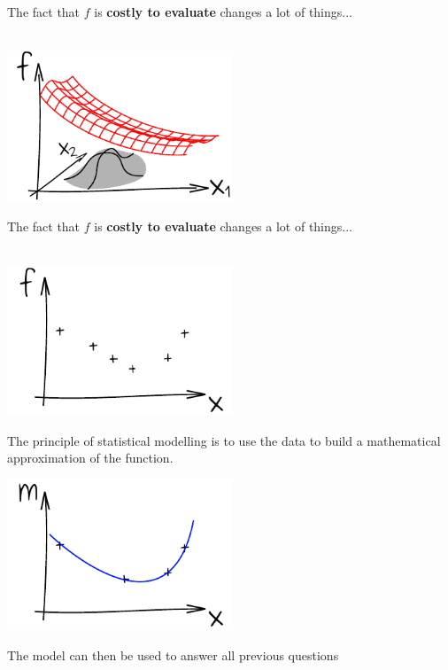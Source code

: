 \begin{frame}{}
The fact that $f$ is \textbf{costly to evaluate} changes a lot of things...\\
\vspace{5mm}
\\
\vspace{5mm}
\begin{center}
\includegraphics[height=4.5cm]{1_stat_models/figures/ink_as}
\end{center}
\end{frame}

\begin{frame}{}
The fact that $f$ is \textbf{costly to evaluate} changes a lot of things...\\
\vspace{5mm}
\\
\vspace{5mm}
\begin{center}
\includegraphics[height=4.5cm]{1_stat_models/figures/ink_fX}
\end{center}
\end{frame}

\begin{frame}{}
The principle of statistical modelling is to use the data to build a mathematical approximation of the function.
\begin{center}
\includegraphics[height=4.5cm]{1_stat_models/figures/ink_m}
\end{center}
The model can then be used to answer all previous questions
\end{frame}

